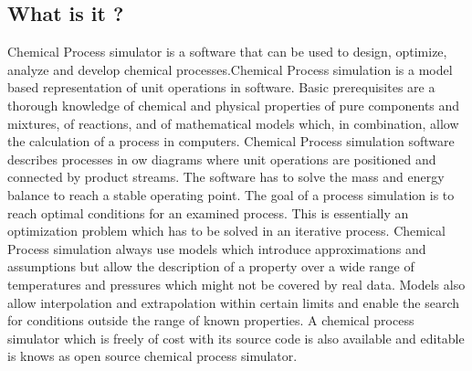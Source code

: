 \documentclass[12pt]{report}
\begin{document}
\subsection{What is it ?}
Chemical Process simulator is a software that can be used to design, optimize, analyze and develop chemical processes.Chemical Process simulation is a model based representation of unit operations in software. Basic prerequisites   are a thorough knowledge of chemical and physical properties of pure components and mixtures, of reactions, and of mathematical models which, in combination, allow the calculation of a process in computers.
Chemical Process simulation software describes processes in ow diagrams where unit operations are positioned and connected by product streams. The software has to solve the mass and energy balance to reach a stable operating point. The goal of a process simulation is to reach optimal conditions for an examined process. This is essentially an optimization problem which has to be solved in an iterative process.
Chemical Process simulation always use models which introduce approximations and assumptions but allow the description of a property over a wide range of temperatures and pressures which might not be covered by real data. Models also allow interpolation and extrapolation within certain limits and enable the search for conditions outside the range of known properties.
A chemical process simulator which is freely of cost with its source code is also available and editable is knows as open source chemical process simulator.
\end{document}

